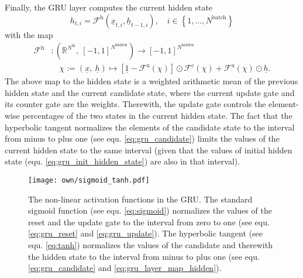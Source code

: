 Finally, the GRU layer computes the current hidden state
\begin{equation} \label{eq:gru_layer_current_hidden}
    h_{t,i}
    =
    \mathcal{F}^\text{h} \left( \underline x_{t,i}, \underline h_{t-1,i}\right)
    ,\quad i \in \left\{1, \dots, N^\text{batch}\right\}
\end{equation}
with the map
\begin{align} \label{eq:gru_layer_map_hidden}
    \mathcal{F}^\text{h}
    &:
    \left(
        \mathbb{R}^{N^\text{in}}
        ,\ 
        \left[-1, 1\right]^{N^\text{hidden}}
    \right)
    \rightarrow
    \left[-1, 1\right]^{N^\text{hidden}}
    \nonumber \\ & \quad
    \chi := \left(
        \underline x
        ,\ 
        \underline h
    \right)
    \mapsto 
    \left[
        \underline 1 
        -
        \mathcal{F}^\text{u}\left(\chi\right)
    \right]
    \odot
    \mathcal{F}^\text{c} \left(\chi\right)
    +
    \mathcal{F}^\text{u}\left(\chi\right)
    \odot
    \underline h
    .
\end{align}
The above map to the hidden state is a weighted arithmetic mean 
of the previous hidden state and the current candidate state, 
where the current update gate and its counter gate are the weights. 
Therewith, the update gate controls the element-wise percentages 
of the two states in the current hidden state. 
The fact that the hyperbolic tangent normalizes the elements 
of the candidate state to the interval from minus to plus one 
(see equ. \ref{eq:gru_candidate})
limits the values of the current hidden state to the same interval 
(given that the values of initial hidden state
(equ. \ref{eq:gru_init_hidden_state})
are also in that interval).
\begin{figure}
    \centering
    \texttt{[image: own/sigmoid\_tanh.pdf]}
    \caption[
        The non-linear activation functions in the GRU
    ]{
        The non-linear activation functions in the GRU.
        The standard sigmoid function
        (see equ. \ref{eq:sigmoid})
        normalizes the values
        of the reset and the update
        gate to the interval from zero to one
        (see equ. \ref{eq:gru_reset} and \ref{eq:gru_update}).
        The hyperbolic tangent
        (see equ. \ref{eq:tanh})
        normalizes the values 
        of the candidate
        and therewith the hidden state 
        to the interval from minus to plus one
        (see equ. \ref{eq:gru_candidate} and \ref{eq:gru_layer_map_hidden}).
        \label{fig:gru_activations}}
\end{figure}




